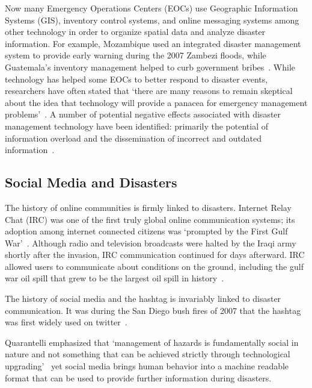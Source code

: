 Now many Emergency Operations Centers (EOCs) use Geographic Information Systems
(GIS), inventory control systems, and online messaging systems among other
technology in order to organize spatial data and analyze disaster information.
For example, Mozambique used an integrated disaster management system to provide
early warning during the 2007  Zambezi floods, while Guatemala's inventory
management helped to curb government bribes~\cite{aminDataNaturalDisasters2008}.
While technology has helped some EOCs to better respond to disaster events,
researchers have often stated that `there are many reasons to remain skeptical
about the idea that technology will provide a panacea for emergency management
problems'~\cite{tzemosUseGISFederal1995, tierneyFacingUnexpectedDisaster2001,
perryNaturalDisasterManagement2007}. A number of potential negative effects
associated with disaster management technology have been identified: primarily
the potential of information overload and the dissemination of incorrect and
outdated information~\cite{quarantelliProblematicalAspectsInformation1997,
flentgeDesigningContextAwareHCI}.

\subsection{Social Media and Disasters}\label{chap2:socialMedia}
The history of online communities is firmly linked to disasters. Internet
Relay Chat (IRC) was one of the first truly global online communication systems;
its adoption among internet connected citizens was `prompted by the First Gulf
War'~\cite{salazarHashtagsAnnotatedHistory2017}. Although radio and
television broadcasts were halted by the Iraqi army shortly after the invasion,
IRC communication continued for days afterward. IRC allowed users to communicate
about conditions on the ground, including the gulf war oil spill that grew to be
the largest oil spill in history~\cite{Timeline20Years2010}.

The history of social media and the hashtag is invariably linked to disaster
communication.  It was during the San Diego bush fires of 2007 that the hashtag
was first widely used on twitter~\cite{salazarHashtagsAnnotatedHistory2017}.

Quarantelli emphasized that  `management of hazards is fundamentally social in
nature and not something that can be achieved strictly through technological
upgrading'~\cite{tierneyFacingUnexpectedDisaster2001} yet social media brings
human behavior into a machine readable format that can be used to provide
further information during disasters.

